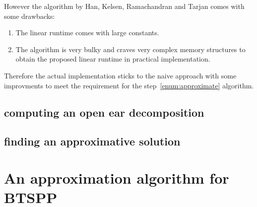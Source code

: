 However the algorithm by Han, Kelsen, Ramachandran and Tarjan comes with some drawbacks:
\begin{enumerate}
  \item The linear runtime comes with large constants.
  \item The algorithm is very bulky and craves very complex memory structures to obtain the proposed linear runtime in practical implementation.
\end{enumerate}

Therefore the actual implementation sticks to the naive approach with some improvments to meet the requirement for the step~\ref{enum:approximate} algorithm.


\subsection{computing an open ear decomposition}
\subsection{finding an approximative solution}

\section{An approximation algorithm for BTSPP}